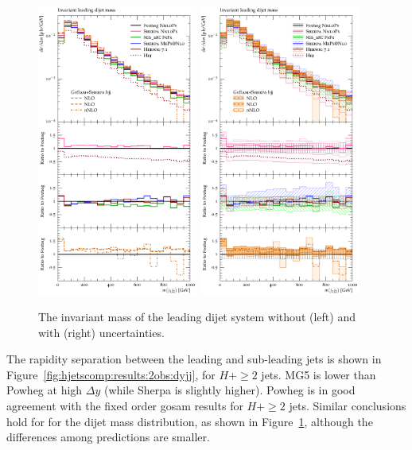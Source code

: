 \begin{figure}[t!]
  \centering
  \includegraphics[width=0.47\textwidth]{figures/hjetscomp_u_dijet_mass.pdf}
  \hfill
  \includegraphics[width=0.47\textwidth]{figures/hjetscomp_dijet_mass.pdf}
  \caption{
    The invariant mass of the leading dijet system without (left) and
    with (right) uncertainties.
    \label{fig:hjetscomp:results:2obs:mjj}
  }
\end{figure}

The rapidity separation between the leading and sub-leading jets is
shown in Figure~\ref{fig:hjetscomp:results:2obs:dyjj}, for $H+\ge2$
jets. MG5 is lower than Powheg at high $\Delta y$ (while Sherpa is
slightly higher).  Powheg is in good agreement with the fixed order
gosam results for $H+\ge2$ jets. Similar conclusions hold for for the
dijet mass distribution, as shown in
Figure~\ref{fig:hjetscomp:results:2obs:mjj}, although the differences
among predictions are smaller.

